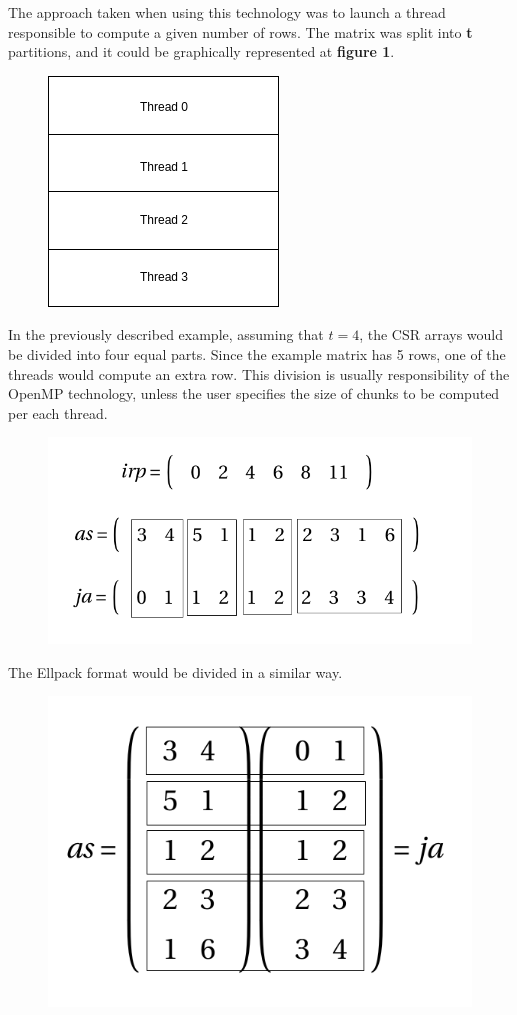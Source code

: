 \documentclass[12pt]{article}
\begin{document}
\par The approach taken when using this technology was to launch a thread responsible to compute a given number of rows. The matrix was split into \textbf{t} partitions, and it could be graphically represented at \textbf{figure 1}. 

\begin{figure}[!htb]
  \centering
  \includegraphics[width=.30\linewidth]{tsplit.png}
\end{figure}

\par In the previously described example, assuming that $t = 4$, the CSR arrays would be divided into four equal parts. Since the example matrix has 5 rows, one of the threads would compute an extra row. This division is usually responsibility of the OpenMP technology, unless the user specifies the size of chunks to be computed per each thread.

\begin{figure}[!htb]
  \centering
  \includegraphics[width=.65\linewidth]{csromp.png}
\end{figure}

\par The Ellpack format would be divided in a similar way.


\begin{figure}[!htb]
  \centering
  \includegraphics[width=.45\linewidth]{ellomp.png}
\end{figure}
\end{document}
